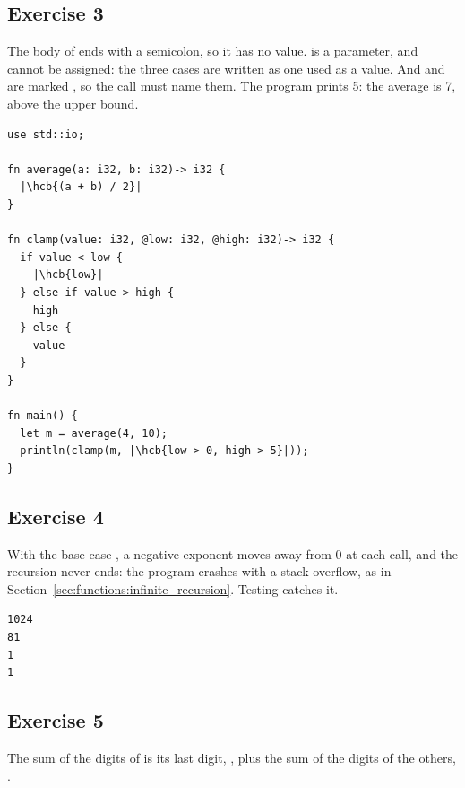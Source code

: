 \subsection*{Exercise 3}

The body of  ends with a semicolon, so it has no value.
 is a parameter, and cannot be assigned: the three cases are
written as one  used as a value. And  and  are
marked , so the call must name them. The program prints 5: the average
is 7, above the upper bound.

\begin{lstlisting}[style=coloredverbatim, escapechar=|, caption=Solution for exercise 3]
use std::io;

fn average(a: i32, b: i32)-> i32 {
  |\hcb{(a + b) / 2}|
}

fn clamp(value: i32, @low: i32, @high: i32)-> i32 {
  if value < low {
    |\hcb{low}|
  } else if value > high {
    high
  } else {
    value
  }
}

fn main() {
  let m = average(4, 10);
  println(clamp(m, |\hcb{low-> 0, high-> 5}|));
}
\end{lstlisting}

\subsection*{Exercise 4}

With the base case , a negative exponent moves away from 0
at each call, and the recursion never ends: the program crashes with a stack
overflow, as in Section~\ref{sec:functions:infinite_recursion}. Testing
 catches it.


\vspace{-10pt}%
\begin{lstlisting}[style=bashVerb]
1024
81
1
1
\end{lstlisting}

\subsection*{Exercise 5}

The sum of the digits of  is its last digit, , plus the
sum of the digits of the others, .



